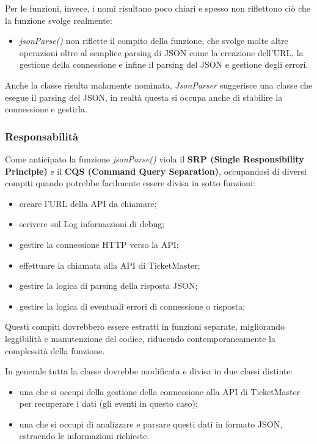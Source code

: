         Per le funzioni, invece, i nomi risultano poco chiari e spesso non riflettono ciò che la funzione svolge realmente:
        \begin{itemize}
            \item \textit{jsonParse()} non riflette il compito della funzione, che svolge molte altre operazioni oltre al semplice parsing di JSON come la creazione dell'URL, 
            la gestione della connessione e infine il parsing del JSON e gestione degli errori.
        \end{itemize}

        Anche la classe risulta malamente nominata, \textit{JsonParser} suggerisce una classe che esegue il parsing del JSON, in realtà questa si occupa anche di stabilire la connessione e gestirla.
    
        \subsubsection{Responsabilità}
        Come anticipato la funzione \textit{jsonParse()} viola il \textbf{SRP (Single Responsibility Principle)} e il \textbf{CQS (Command Query Separation)}, occupandosi di diversi compiti 
        quando potrebbe facilmente essere divisa in sotto funzioni: 
        \begin{itemize}
            \item creare l'URL della API da chiamare;
            \item scrivere sul Log informazioni di debug;
            \item gestire la connessione HTTP verso la API;
            \item effettuare la chiamata alla API di TicketMaster;
            \item gestire la logica di parsing della risposta JSON;
            \item gestire la logica di eventuali errori di connessione o risposta;
        \end{itemize}

        Questi compiti dovrebbero essere estratti in funzioni separate, migliorando leggibilità e manutenzione del codice, riducendo contemporaneamente la complessità della funzione.

        In generale tutta la classe dovrebbe modificata e divisa in due classi distinte:
        \begin{itemize}
            \item una che si occupi della gestione della connessione alla API di TicketMaster per recuperare i dati (gli eventi in questo caso);
            \item una che si occupi di analizzare e parsare questi dati in formato JSON, estraendo le informazioni richieste.
        \end{itemize}

